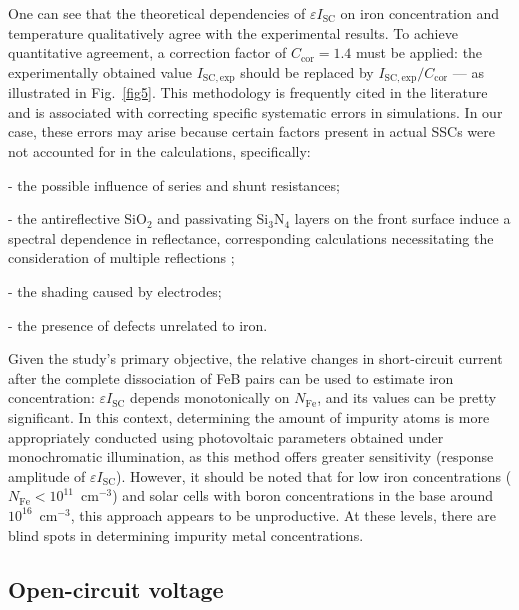 \documentclass[a4paper,fleqn]{cas-sc}
\begin{document}
One can see that the theoretical dependencies of $\varepsilon I_\mathrm{SC}$
on iron concentration and temperature qualitatively agree with the experimental results.
To achieve quantitative agreement, a correction factor of $C_\mathrm{cor} = 1.4$ must be applied:
the experimentally obtained value $I_\mathrm{SC,exp}$ should be replaced by $I_\mathrm{SC,exp} / C_\mathrm{cor}$ --- as illustrated in Fig.~\ref{fig5}.
This methodology is frequently cited in the literature \cite{IronSC} and is associated with correcting specific systematic errors in simulations.
In our case, these errors may arise because certain factors present in actual SSCs were not accounted for in the calculations, specifically:

\noindent
- the possible influence of series and shunt resistances;

\noindent
- the antireflective SiO$_2$ and passivating Si$_3$N$_4$ layers on the front surface induce a spectral dependence in reflectance, corresponding calculations necessitating the consideration of multiple reflections \cite{KostRefl2000};

\noindent
- the shading caused by electrodes;

\noindent
- the presence of defects unrelated to iron.


Given the study's primary objective,
the relative changes in short-circuit current after the complete dissociation of FeB pairs
can be used to estimate iron concentration:
$\varepsilon I_\mathrm{SC}$ depends monotonically on $N_\mathrm{Fe}$, and its values can be pretty significant.
In this context, determining the amount of impurity atoms is more appropriately conducted
using photovoltaic parameters obtained under monochromatic illumination,
as this method offers greater sensitivity (response amplitude of $\varepsilon I_\mathrm{SC}$).
However, it should be noted that for low iron concentrations ($N_\mathrm{Fe}<10^{11}$~cm$^{-3}$)
and solar cells with boron concentrations in the base around $10^{16}$~cm$^{-3}$,
this approach appears to be unproductive.
At these levels, there are blind spots in determining impurity metal concentrations.


\subsection{Open-circuit voltage}
\end{document}
